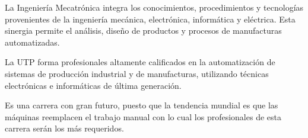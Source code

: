 \documentclass[a4paper,12pt]{article}
\begin{document}
\par
La Ingeniería Mecatrónica integra los conocimientos, procedimientos y tecnologías provenientes de la ingeniería mecánica, electrónica, informática y eléctrica. Esta sinergia permite el análisis, diseño de productos y procesos de manufacturas automatizadas.\\
\par
La UTP forma profesionales altamente calificados en la automatización de sistemas de producción industrial y de manufacturas, utilizando técnicas electrónicas e informáticas de última generación.\\
\par
Es una carrera con gran futuro, puesto que la tendencia mundial es que las máquinas reemplacen el trabajo manual con lo cual los profesionales de esta carrera serán los más requeridos.\\
\par
\end{document}
